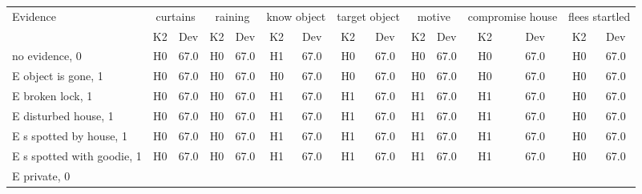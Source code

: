 \begin{table}\begin{tabular}{l|cc|cc|cc|cc|cc|cc|cc}\toprule\multirow{2}{*}{Evidence} & \multicolumn{2}{c}{curtains}& \multicolumn{2}{c}{raining}& \multicolumn{2}{c}{know object}& \multicolumn{2}{c}{target object}& \multicolumn{2}{c}{motive}& \multicolumn{2}{c}{compromise house}& \multicolumn{2}{c}{flees startled}\\& {K2} & {Dev}& {K2} & {Dev}& {K2} & {Dev}& {K2} & {Dev}& {K2} & {Dev}& {K2} & {Dev}& {K2} & {Dev}\\\midrule
no evidence, 0 & \cellcolor{Bittersweet}H0&\cellcolor{Bittersweet}67.0&\cellcolor{Bittersweet}H0&\cellcolor{Bittersweet}67.0&\cellcolor{Bittersweet}H1&\cellcolor{Bittersweet}67.0&\cellcolor{Bittersweet}H0&\cellcolor{Bittersweet}67.0&\cellcolor{Bittersweet}H0&\cellcolor{Bittersweet}67.0&\cellcolor{Bittersweet}H0&\cellcolor{Bittersweet}67.0&\cellcolor{Bittersweet}H0&\cellcolor{Bittersweet}67.0\\E object is gone, 1 & \cellcolor{Bittersweet}H0&\cellcolor{Bittersweet}67.0&\cellcolor{Bittersweet}H0&\cellcolor{Bittersweet}67.0&\cellcolor{Bittersweet}H0&\cellcolor{Bittersweet}67.0&\cellcolor{Bittersweet}H0&\cellcolor{Bittersweet}67.0&\cellcolor{Bittersweet}H0&\cellcolor{Bittersweet}67.0&\cellcolor{Bittersweet}H0&\cellcolor{Bittersweet}67.0&\cellcolor{Bittersweet}H0&\cellcolor{Bittersweet}67.0\\E broken lock, 1 & \cellcolor{Bittersweet}H0&\cellcolor{Bittersweet}67.0&\cellcolor{Bittersweet}H0&\cellcolor{Bittersweet}67.0&\cellcolor{Bittersweet}H1&\cellcolor{Bittersweet}67.0&\cellcolor{Bittersweet}H1&\cellcolor{Bittersweet}67.0&\cellcolor{Bittersweet}H1&\cellcolor{Bittersweet}67.0&\cellcolor{Bittersweet}H1&\cellcolor{Bittersweet}67.0&\cellcolor{Bittersweet}H0&\cellcolor{Bittersweet}67.0\\E disturbed house, 1 & \cellcolor{Bittersweet}H0&\cellcolor{Bittersweet}67.0&\cellcolor{Bittersweet}H0&\cellcolor{Bittersweet}67.0&\cellcolor{Bittersweet}H1&\cellcolor{Bittersweet}67.0&\cellcolor{Bittersweet}H1&\cellcolor{Bittersweet}67.0&\cellcolor{Bittersweet}H1&\cellcolor{Bittersweet}67.0&\cellcolor{Bittersweet}H1&\cellcolor{Bittersweet}67.0&\cellcolor{Bittersweet}H0&\cellcolor{Bittersweet}67.0\\E s spotted by house, 1 & \cellcolor{Bittersweet}H0&\cellcolor{Bittersweet}67.0&\cellcolor{Bittersweet}H0&\cellcolor{Bittersweet}67.0&\cellcolor{Bittersweet}H1&\cellcolor{Bittersweet}67.0&\cellcolor{Bittersweet}H1&\cellcolor{Bittersweet}67.0&\cellcolor{Bittersweet}H1&\cellcolor{Bittersweet}67.0&\cellcolor{Bittersweet}H1&\cellcolor{Bittersweet}67.0&\cellcolor{Bittersweet}H0&\cellcolor{Bittersweet}67.0\\E s spotted with goodie, 1 & \cellcolor{Bittersweet}H0&\cellcolor{Bittersweet}67.0&\cellcolor{Bittersweet}H0&\cellcolor{Bittersweet}67.0&\cellcolor{Bittersweet}H1&\cellcolor{Bittersweet}67.0&\cellcolor{Bittersweet}H1&\cellcolor{Bittersweet}67.0&\cellcolor{Bittersweet}H1&\cellcolor{Bittersweet}67.0&\cellcolor{Bittersweet}H1&\cellcolor{Bittersweet}67.0&\cellcolor{Bittersweet}H0&\cellcolor{Bittersweet}67.0\\E private, 0 & 
\end{tabular}
\end{table}
